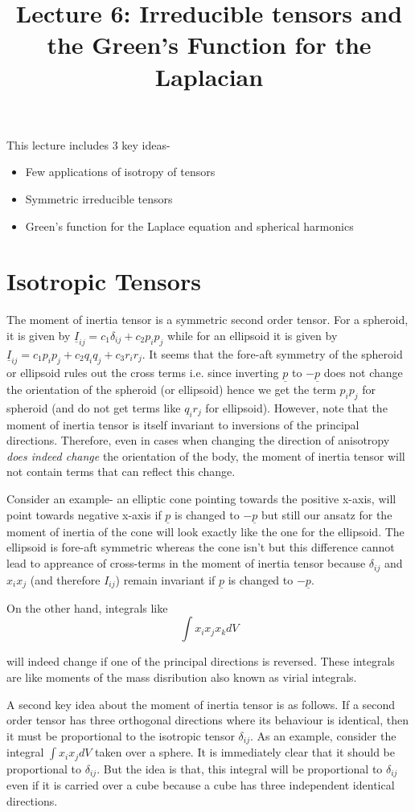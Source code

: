 \documentclass[11pt, letterpaper]{article}
\title{Lecture 6: Irreducible tensors and the Green's Function for the Laplacian}
\newcommand{\dij}{\delta_{ij}}
\newcommand{\1}{\bm{1}}
\newcommand{\un}[1]{\underline{#1}}
\begin{document}
\maketitle
This lecture includes 3 key ideas-
\begin{itemize}
\item Few applications of isotropy of tensors
\item Symmetric irreducible tensors
\item Green's function for the Laplace equation and spherical harmonics
\end{itemize}

\section{Isotropic Tensors}
The moment of inertia tensor is a symmetric second order tensor. For a spheroid, it is given by $\un{I}_{ij} = c_1 \dij + c_2 p_ip_j$ while for an ellipsoid it is given by $\un{I}_{ij} = c_1 p_ip_j + c_2 q_iq_j + c_3 r_ir_j$. It seems that the fore-aft symmetry of the spheroid or ellipsoid rules out the cross terms i.e. since inverting $\un{p}$ to $-\un{p}$ does not change the orientation of the spheroid (or ellipsoid) hence we get the term $p_ip_j$ for spheroid (and do not get terms like $q_i r_j$ for ellipsoid). However, note that the moment of inertia tensor is itself invariant to inversions of the principal directions. Therefore, even in cases when changing the direction of anisotropy \textit{does indeed change} the orientation of the body, the moment of inertia tensor will not contain terms that can reflect this change.
 
Consider an example- an elliptic cone pointing towards the positive x-axis, will point towards negative x-axis if $\un{p}$ is changed to $-\un{p}$ but still our ansatz for the moment of inertia of the cone will look exactly like the one for the ellipsoid. The ellipsoid is fore-aft symmetric whereas the cone isn't but this difference cannot lead to appreance of cross-terms in the moment of inertia tensor because $\dij$  and $x_ix_j$ (and therefore $I_{ij}$) remain invariant if $\un{p}$ is changed to $-\un{p}$.

On the other hand, integrals like 
$$
\int x_ix_jx_k dV
$$

will indeed change if one of the principal directions is reversed. These integrals are like moments of the mass disribution also known as virial integrals.


A second key idea about the moment of inertia tensor is as follows. If a second order tensor has three orthogonal directions where its behaviour is identical, then it must be proportional to the isotropic tensor $\dij$. As an example, consider the integral $\int x_ix_j dV$ taken over a sphere. It is immediately clear that it should be proportional to $\dij$. But the idea is that, this integral will be proportional to $\dij$ even if it is carried over a cube because a cube has three independent identical directions.
\end{document}
